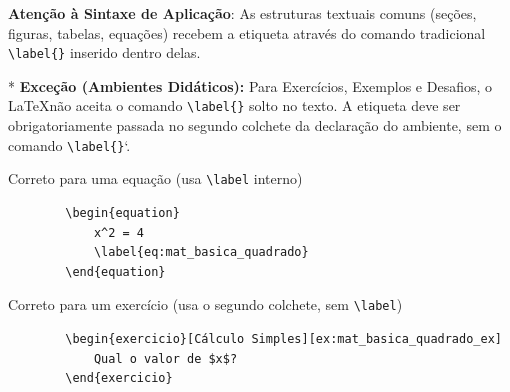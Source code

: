 

\textbf{Atenção à Sintaxe de Aplicação}: As estruturas textuais comuns (seções, figuras, tabelas, equações) recebem a etiqueta através do comando tradicional \verb|\label{}| inserido dentro delas. 

* \textbf{Exceção (Ambientes Didáticos):} Para Exercícios, Exemplos e Desafios, o \LaTeX não aceita o comando \verb|\label{}| solto no texto. A etiqueta deve ser obrigatoriamente passada no segundo colchete da declaração do ambiente, sem o comando \verb|\label{}|`.

\begin{exemplo}
    Correto para uma equação (usa \verb|\label| interno)
    \begin{verbatim}
        \begin{equation}
            x^2 = 4
            \label{eq:mat_basica_quadrado}
        \end{equation}
    \end{verbatim}

    Correto para um exercício (usa o segundo colchete, sem \verb|\label|)
    \begin{verbatim}
        \begin{exercicio}[Cálculo Simples][ex:mat_basica_quadrado_ex]
            Qual o valor de $x$?
        \end{exercicio}
    \end{verbatim}
\end{exemplo}